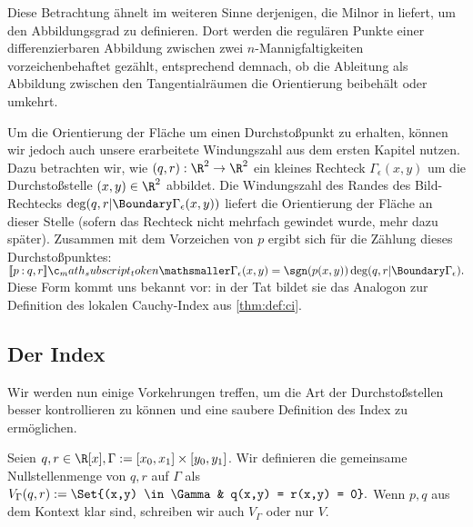 \documentclass{mythesis}
\begin{document}
Diese Betrachtung ähnelt im weiteren Sinne derjenigen, die Milnor in \cite[§5]{milnor_topdiff} liefert, um den Abbildungsgrad zu definieren.
Dort werden die regulären Punkte einer differenzierbaren Abbildung zwischen zwei $n$-Mannigfaltigkeiten vorzeichenbehaftet gezählt, entsprechend demnach, ob die Ableitung als Abbildung zwischen den Tangentialräumen die Orientierung beibehält oder umkehrt.

Um die Orientierung der Fläche um einen Durchstoßpunkt zu erhalten, können wir jedoch auch unsere erarbeitete Windungszahl aus dem ersten Kapitel nutzen.
Dazu betrachten wir, wie $(q, r): \R^2 \to \R^2$ ein kleines Rechteck $\Gamma_\epsilon(x,y)$ um die Durchstoßstelle $(x,y) \in \R^2$ abbildet.
Die Windungszahl des Randes des Bild-Rechtecks $\deg(q,r|\Boundary\Gamma_\epsilon(x,y))$ liefert die Orientierung der Fläche an dieser Stelle (sofern das Rechteck nicht mehrfach gewindet wurde, mehr dazu später).
Zusammen mit dem Vorzeichen von $p$ ergibt sich für die Zählung dieses Durchstoßpunktes:
\begin{math}
    \Index{\Gamma_\epsilon(x,y)}{p}{q,r}
    = \sgn(p(x,y)) \deg(q,r|\Boundary\Gamma_\epsilon).
\end{math}
Diese Form kommt uns bekannt vor: in der Tat bildet sie das Analogon zur Definition des lokalen Cauchy-Index aus \ref{thm:def:ci}.

\subsection{Der Index}


Wir werden nun einige Vorkehrungen treffen, um die Art der Durchstoßstellen besser kontrollieren zu können und eine saubere Definition des Index zu ermöglichen.



\begin{definition}
    Seien $q, r \in \R[x], \Gamma := [x_0, x_1] \times [y_0, y_1]$.
    Wir definieren die gemeinsame Nullstellenmenge von $q, r$ auf $\Gamma$ als
    \begin{math}
        V_\Gamma(q,r) :=
        \Set{(x,y) \in \Gamma & q(x,y) = r(x,y) = 0}.
    \end{math}
    Wenn $p, q$ aus dem Kontext klar sind, schreiben wir auch $V_\Gamma$ oder nur $V$.
\end{definition}
\end{document}
